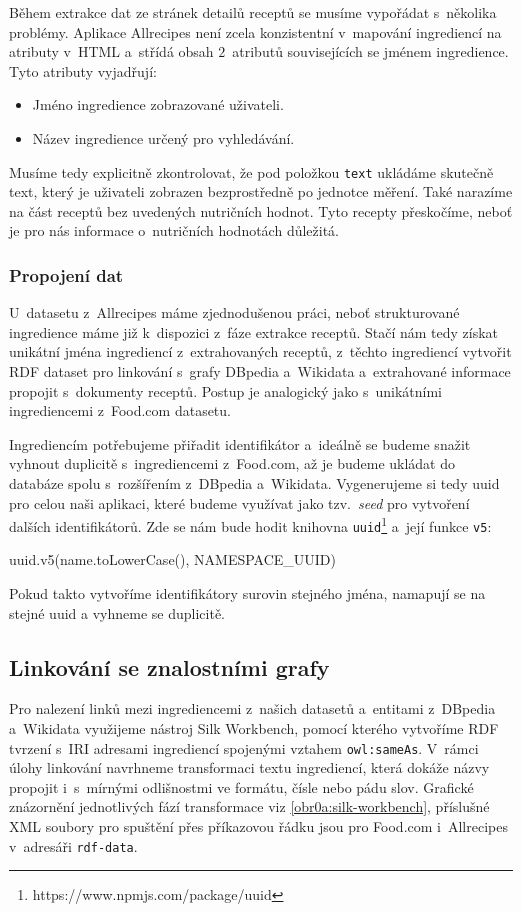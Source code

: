 Během extrakce dat ze stránek detailů receptů se musíme vypořádat s~několika problémy. Aplikace Allrecipes není zcela konzistentní v~mapování ingrediencí na atributy v~HTML a~střídá obsah $2$~atributů souvisejících se jménem ingredience. Tyto atributy vyjadřují:
\begin{itemize}
    \item Jméno ingredience zobrazované uživateli.
    \item Název ingredience určený pro vyhledávání.
\end{itemize}
Musíme tedy explicitně zkontrolovat, že pod položkou \texttt{text} ukládáme skutečně text, který je uživateli zobrazen bezprostředně po jednotce měření. Také narazíme na část receptů bez uvedených nutričních hodnot. Tyto recepty přeskočíme, neboť je pro nás informace o~nutričních hodnotách důležitá.

\subsubsection{Propojení dat}

U~datasetu z~Allrecipes máme zjednodušenou práci, neboť strukturované ingredience máme již k~dispozici z~fáze extrakce receptů. Stačí nám tedy získat unikátní jména ingrediencí z~extrahovaných receptů, z~těchto ingrediencí vytvořit RDF dataset pro linkování s~grafy DBpedia a~Wikidata a~extrahované informace propojit s~dokumenty receptů. Postup je analogický jako s~unikátními ingrediencemi z~Food.com datasetu. 

Ingrediencím potřebujeme přiřadit identifikátor a~ideálně se budeme snažit vyhnout duplicitě s~ingrediencemi z~Food.com, až je budeme ukládat do databáze spolu s~rozšířením z~DBpedia a~Wikidata. Vygenerujeme si tedy uuid pro celou naši aplikaci, které budeme využívat jako tzv.~\emph{seed} pro vytvoření dalších identifikátorů. Zde se nám bude hodit knihovna \texttt{uuid}\footnote{https://www.npmjs.com/package/uuid} a~její funkce \texttt{v5}:
\begin{code}
uuid.v5(name.toLowerCase(), NAMESPACE_UUID)
\end{code}
Pokud takto vytvoříme identifikátory surovin stejného jména, namapují se na stejné uuid a vyhneme se duplicitě.

\subsection{Linkování se znalostními grafy}

Pro nalezení linků mezi ingrediencemi z~našich datasetů a~entitami z~DBpedia a~Wikidata využijeme nástroj Silk Workbench, pomocí kterého vytvoříme RDF tvrzení s~IRI adresami ingrediencí spojenými vztahem \texttt{owl:sameAs}. V~rámci úlohy linkování navrhneme transformaci textu ingrediencí, která dokáže názvy propojit i~s~mírnými odlišnostmi ve formátu, čísle nebo pádu slov. Grafické znázornění jednotlivých fází transformace viz \ref{obr0a:silk-workbench}, příslušné XML soubory pro spuštění přes příkazovou řádku jsou pro Food.com i~Allrecipes v~adresáři \texttt{rdf-data}.

